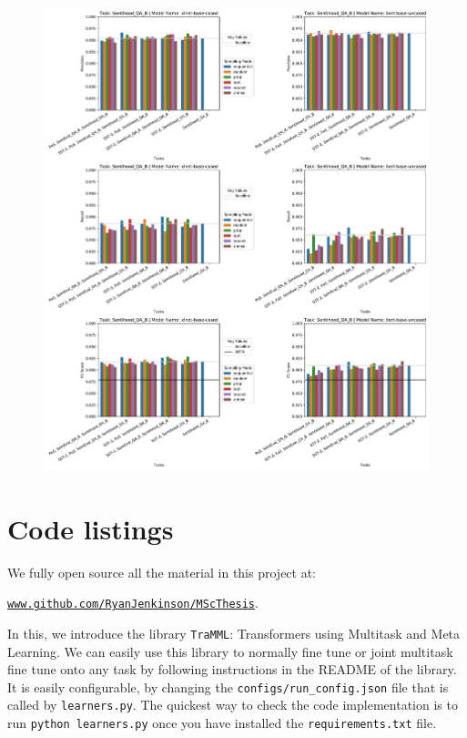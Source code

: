 \documentclass[11pt]{report}
\theoremstyle{Definition}
\theoremstyle{remark}
\begin{document}
\begin{figure}
	\includegraphics[width=\textwidth]{SentihoodResults2.pdf}
	\label{fig:experiments:sentihoodresults}
\end{figure}
\chapter{Code listings} \label{appendix:code}
We fully open source all the material in this project at:
 \begin{center}
	\href{www.github.com/RyanJenkinson/MScThesis}{\texttt{www.github.com/RyanJenkinson/MScThesis}}.
\end{center}
In this, we introduce the library \texttt{TraMML}: Transformers using Multitask and Meta Learning. We can easily use this library to normally fine tune or joint multitask fine tune onto any task by following instructions in the README of the library. It is easily configurable, by changing the \texttt{configs/run\_config.json} file that is called by \texttt{learners.py}. The quickest way to check the code implementation is to run \texttt{python learners.py} once you have installed the \texttt{requirements.txt} file.
\end{document}
